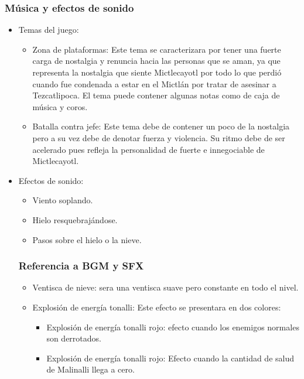 \documentclass[11pt,letterpaper]{article}
\begin{document}
        \subsubsection{Música y efectos de sonido}
\begin{itemize} 
        \item Temas del juego:
\begin{itemize} 
        \item Zona de plataformas: Este tema se caracterizara por tener una fuerte carga de nostalgia y renuncia hacia las personas que se aman, ya que representa la nostalgia que siente Mictlecayotl por todo lo que perdió cuando fue condenada a estar en el Mictlán por tratar de asesinar a Tezcatlipoca. El tema puede contener algunas notas como de caja de música y coros.
        \item Batalla contra jefe: Este tema debe de contener un poco de la nostalgia pero a su vez debe de denotar fuerza y violencia. Su ritmo debe de ser acelerado pues refleja la personalidad de fuerte e innegociable de Mictlecayotl.
\end{itemize}
        \item Efectos de sonido:
\begin{itemize} 
        \item Viento soplando.
        \item Hielo resquebrajándose.
        \item Pasos sobre el hielo o la nieve.	
\end{itemize}

        \subsubsection{Referencia a BGM y SFX}
\begin{itemize} 
        \item Ventisca de nieve: sera una ventisca suave pero constante en todo el nivel.
\item Explosión de energía tonalli: Este efecto se presentara en dos colores:
        \begin{itemize}
                \item Explosión de energía tonalli rojo: efecto cuando los enemigos normales son derrotados.
                \item Explosión de energía tonalli rojo: Efecto cuando la cantidad de salud de Malinalli llega a cero.
        \end{itemize}
\end{itemize} 
\end{itemize} 
\end{document}
